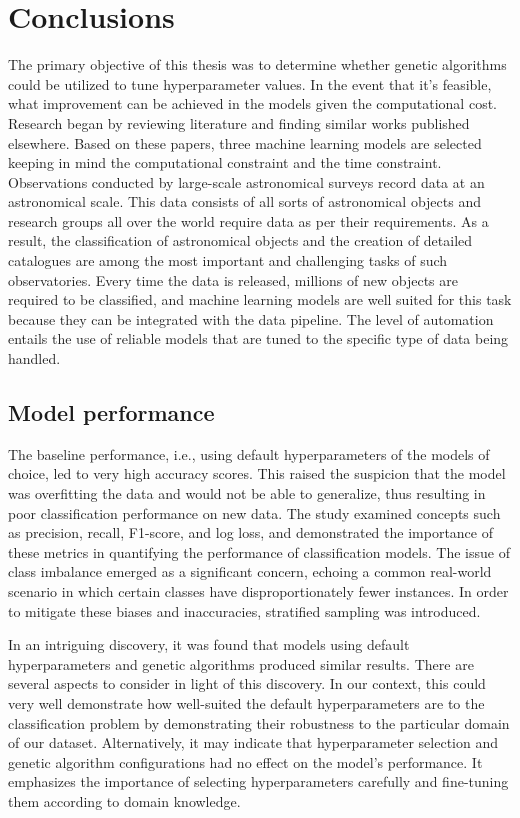 \chapter{Conclusions}

The primary objective of this thesis was to determine whether genetic algorithms could be utilized to tune hyperparameter values.  In the event that it's feasible, what improvement can be achieved in the models given the computational cost. Research began by reviewing literature and finding similar works published elsewhere. Based on these papers, three machine learning models are selected keeping in mind the computational constraint and the time constraint. Observations conducted by large-scale astronomical surveys record data at an astronomical scale. This data consists of all sorts of astronomical objects and research groups all over the world require data as per their requirements. As a result, the classification of astronomical objects and the creation of detailed catalogues are among the most important and challenging tasks of such observatories.  Every time the data is released, millions of new objects are required to be classified, and machine learning models are well suited for this task because they can be integrated with the data pipeline. The level of automation entails the use of reliable models that are tuned to the specific type of data being handled. 

\section{Model performance}
The baseline performance, i.e., using default hyperparameters of the models of choice, led to very high accuracy scores. This raised the suspicion that the model was overfitting the data and would not be able to generalize, thus resulting in poor classification performance on new data. The study examined concepts such as precision, recall, F1-score, and log loss, and demonstrated the importance of these metrics in quantifying the performance of classification models. The issue of class imbalance emerged as a significant concern, echoing a common real-world scenario in which certain classes have disproportionately fewer instances. In order to mitigate these biases and inaccuracies, stratified sampling was introduced.

In an intriguing discovery, it was found that models using default hyperparameters and genetic algorithms produced similar results. There are several aspects to consider in light of this discovery. In our context, this could very well demonstrate how well-suited the default hyperparameters are to the classification problem by demonstrating their robustness to the particular domain of our dataset. Alternatively, it may indicate that hyperparameter selection and genetic algorithm configurations had no effect on the model's performance. It emphasizes the importance of selecting hyperparameters carefully and fine-tuning them according to domain knowledge.

